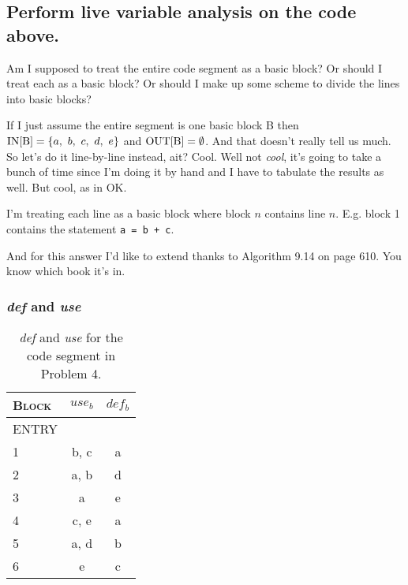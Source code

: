 \subsection{Perform live variable analysis on the code above.}

Am I supposed to treat the entire code segment as a basic block?
Or should I treat each as a basic block?
Or should I make up some scheme to divide the lines into basic blocks?

If I just assume the entire segment is one basic block B then $\text{IN[B]} = \{a,~b,~c,~d,~e\}$ and $\text{OUT[B]} = \emptyset$.
And that doesn't really tell us much.
So let's do it line-by-line instead, ait?
Cool.
Well not \emph{cool}, it's going to take a bunch of time since I'm doing it by hand and I have to tabulate the results as well.
But cool, as in OK.

I'm treating each line as a basic block where block $n$ contains line $n$.
E.g. block 1 contains the statement \texttt{a = b + c}.


And for this answer I'd like to extend thanks to Algorithm 9.14 on page 610.
You know which book it's in.

\setcounter{subsubsection}{-1} %
\subsubsection{\emph{def} and \emph{use}}
\begin{table}[H]
\centering
\begin{tabular}{lcc}
	\toprule
	\textsc{Block}	& $use_b$	& $def_b$	\\
	\midrule
	ENTRY	& 			&			\\
	1		& b, c		& a 		\\
	2		& a, b		& d			\\
	3		& a			& e			\\
	4		& c, e		& a			\\
	5		& a, d		& b			\\
	6		& e			& c			\\
	\bottomrule
\end{tabular}
\caption{\emph{def} and \emph{use} for the code segment in Problem 4.}
\label{tab:4-b-0}
\end{table}

